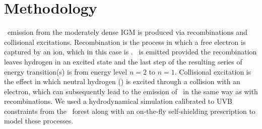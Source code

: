 \section{Methodology}
\label{chPsec:Methodology}

\lya\ emission from the moderately dense IGM is produced via recombinations and collisional excitations. Recombination is the process in which a free electron is captured by an ion, which in this case is . \lya\ is emitted provided the recombination leaves hydrogen in an excited state and the last step of the resulting series of energy transition(s) is from energy level $n=2$ to $n=1$. Collisional excitation is the effect in which neutral hydrogen () is excited through a collision with an electron, which can subsequently lead to the emission of \lya\ in the same way as with recombinations. We used a hydrodynamical simulation calibrated to UVB constraints from the \lya\ forest along with an on-the-fly self-shielding prescription to model these processes.

